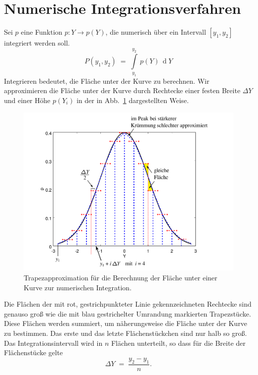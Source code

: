 
\section{Numerische Integrationsverfahren}
Sei $p$ eine Funktion $p \! : Y \rightarrow p(Y)$, die numerisch über ein
Intervall $[y_1, y_2]$ integriert werden soll.
\begin{equation}
P(y_1, y_2) \; = \; \int\limits_{y_1}^{y_2} \, p(Y) \, \operatorname{d}Y
\end{equation}
Integrieren bedeutet, die Fläche unter der Kurve zu berechnen. Wir approximieren die
Fläche unter der Kurve durch Rechtecke einer festen Breite $\Delta Y$ und einer Höhe
$p(Y_i)$ in der in Abb.~\ref{Trapez} dargestellten Weise.
\begin{figure}
\begin{center}
\includegraphics[width=130mm]{07_vorlesung/media/numerischeIntTrapez.pdf}
\caption{\label{Trapez} Trapezapproximation für die Berechnung der Fläche unter einer
Kurve zur numerischen Integration.}
\end{center}
\end{figure}
Die Flächen der mit rot, gestrichpunkteter Linie gekennzeichneten Rechtecke sind genauso
groß wie die mit blau gestrichelter Umrandung markierten Trapezstücke. Diese Flächen
werden summiert, um näherungsweise die Fläche unter der Kurve zu bestimmen.
Das erste und das letzte Flächenstückchen sind nur halb so groß.
Das Integrationsintervall wird in $n$ Flächen unterteilt, so dass für die Breite
der Flächenstücke gelte
\begin{equation}
\Delta Y \; = \; \frac{y_2 - y_1}{n} .
\end{equation}
